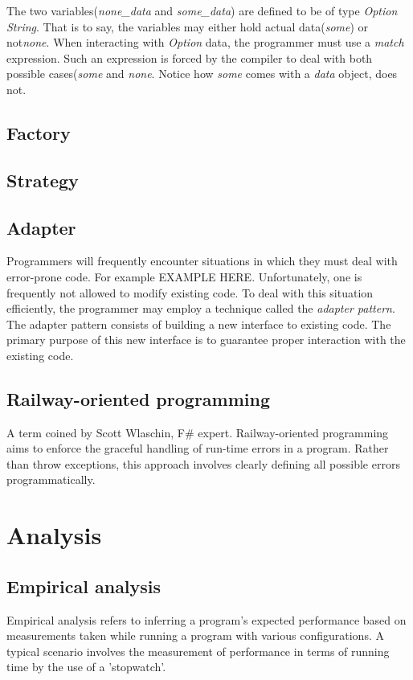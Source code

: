 \documentclass{article}
\begin{document}
The two variables({\em none_data} and {\em some_data}) are defined to be of type {\em Option String}.
That is to say, the variables may either hold actual data({\em some}) or not{\em none}.
When interacting with {\em Option} data, the programmer must use a {\em match} expression.
Such an expression is forced by the compiler to deal with both possible cases({\em some} and {\em none}.
Notice how {\em some} comes with a {\em data} object, {\none} does not.

\subsection{Factory}
\subsection{Strategy}

\subsection{Adapter}
Programmers will frequently encounter situations in which they must deal with error-prone code.
For example {\huge EXAMPLE HERE}.
Unfortunately, one is frequently not allowed to modify existing code.
To deal with this situation efficiently, the programmer may employ a technique called the {\em adapter pattern}.
The adapter pattern consists of building a new interface to existing code.
The primary purpose of this new interface is to guarantee proper interaction with the existing code.

\subsection{Railway-oriented programming}
A term coined by Scott Wlaschin, F\# expert.
Railway-oriented programming aims to enforce the graceful handling of run-time errors in a program.
Rather than throw exceptions, this approach involves clearly defining all possible errors programmatically.

\newpage

\section{Analysis}
\subsection{Empirical analysis}
Empirical analysis refers to inferring a program's expected performance based on measurements taken while running a program with various configurations.
A typical scenario involves the measurement of performance in terms of running time by the use of a 'stopwatch'.
\end{document}
